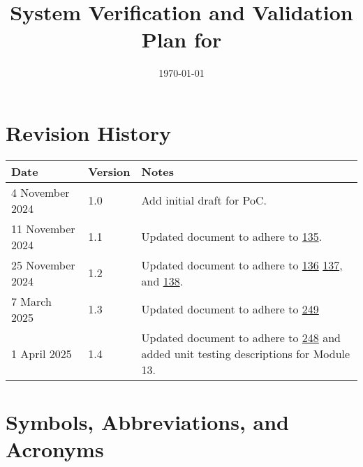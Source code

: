 \documentclass[12pt, titlepage]{article}
\begin{document}
\title{System Verification and Validation Plan for \progname{}} 
\author{\authname}
\date{\today}
	
\maketitle


\section*{Revision History}

\begin{tabularx}{\textwidth}{p{4cm}p{1.5cm}X} \toprule {\bf Date} & {\bf Version}
& {\bf Notes}\\
\midrule
4 November 2024 & 1.0 & Add initial draft for PoC.\\
11 November 2024 & 1.1 & Updated document to adhere to
\href{https://github.com/SumanyaG/Alkalytics/issues/135}{135}. \\
25 November 2024 & 1.2 & Updated document to adhere to
\href{https://github.com/SumanyaG/Alkalytics/issues/136}{136}
\href{https://github.com/SumanyaG/Alkalytics/issues/137}{137}, and
\href{https://github.com/SumanyaG/Alkalytics/issues/138}{138}. \\
7 March 2025 & 1.3 & Updated document to adhere to
\href{https://github.com/SumanyaG/Alkalytics/issues/249}{249} \\
1 April 2025 & 1.4 & Updated document to adhere to
\href{https://github.com/SumanyaG/Alkalytics/issues/248}{248} and added unit
testing descriptions for Module 13. \\
\bottomrule
\end{tabularx}

\newpage

\tableofcontents

\listoftables

\newpage

\section{Symbols, Abbreviations, and Acronyms}
\end{document}
